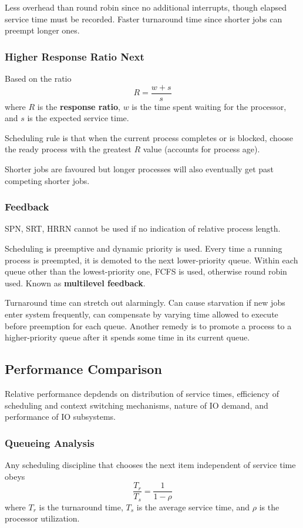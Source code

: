 \documentclass[11pt]{article}
\begin{document}
Less overhead than round robin since no additional interrupts, though elapsed service
time must be recorded.
Faster turnaround time since shorter jobs can preempt longer ones.
\subsubsection{Higher Response Ratio Next}
\label{sec:orgbdca44a}
Based on the ratio
$$
R = \frac{w + s}{s}
$$
where \(R\) is the \textbf{response ratio}, \(w\) is the time spent waiting for the processor, and
\(s\) is the expected service time.

Scheduling rule is that when the current process completes or is blocked, choose the
ready process with the greatest \(R\) value (accounts for process age).

Shorter jobs are favoured but longer processes will also eventually get past competing
shorter jobs.
\subsubsection{Feedback}
\label{sec:org72fecf8}
SPN, SRT, HRRN cannot be used if no indication of relative process length.

Scheduling is preemptive and dynamic priority is used.
Every time a running process is preempted, it is demoted to the next lower-priority
queue.
Within each queue other than the lowest-priority one, FCFS is used, otherwise round
robin used.
Known as \textbf{multilevel feedback}.

Turnaround time can stretch out alarmingly. Can cause starvation if new jobs enter
system frequently, can compensate by varying time allowed to execute before
preemption for each queue.
Another remedy is to promote a process to a higher-priority queue after it spends
some time in its current queue.
\subsection{Performance Comparison}
\label{sec:org0832264}
Relative performance depdends on distribution of service times, efficiency of scheduling
and context switching mechanisms, nature of IO demand, and performance of IO subsystems.
\subsubsection{Queueing Analysis}
\label{sec:org5060f51}
Any scheduling discipline that chooses the next item independent of service time obeys
$$
\frac{T_{r}}{T_{s}} = \frac{1}{1 - \rho}
$$
where \(T_{r}\) is the turnaround time, \(T_{s}\) is the average service time, and \(\rho\)
is the processor utilization.
\end{document}

